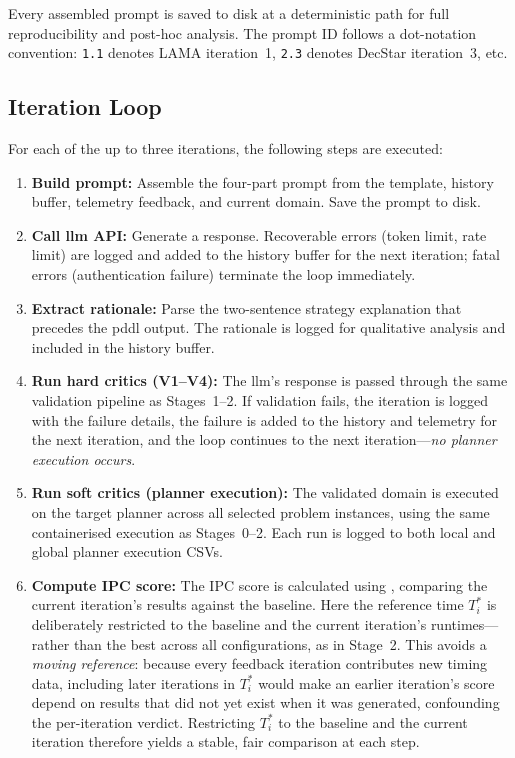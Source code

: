 Every assembled prompt is saved to disk at a deterministic path for full reproducibility and post-hoc analysis.
The prompt ID follows a dot-notation convention: \texttt{1.1} denotes LAMA iteration~1, \texttt{2.3} denotes DecStar iteration~3, etc.

\subsection{Iteration Loop}
\label{sec:design:stage3:loop}

For each of the up to three iterations, the following steps are executed:

\begin{enumerate}
  \item \textbf{Build prompt:}
        Assemble the four-part prompt from the template, history buffer, telemetry feedback, and current domain.
        Save the prompt to disk.

  \item \textbf{Call \gls{llm} API:}
        Generate a response.
        Recoverable errors (token limit, rate limit) are logged and added to the history buffer for the next iteration; fatal errors (authentication failure) terminate the loop immediately.

  \item \textbf{Extract rationale:}
        Parse the two-sentence strategy explanation that precedes the \gls{pddl} output.
        The rationale is logged for qualitative analysis and included in the history buffer.

  \item \textbf{Run hard critics (V1--V4):}
        The \gls{llm}'s response is passed through the same validation pipeline as Stages~1--2.
        If validation fails, the iteration is logged with the failure details, the failure is added to the history and telemetry for the next iteration, and the loop continues to the next iteration---\emph{no planner execution occurs}.

  \item \textbf{Run soft critics (planner execution):}
        The validated domain is executed on the target planner across all selected problem instances, using the same containerised execution as Stages~0--2.
        Each run is logged to both local and global planner execution CSVs.

  \item \textbf{Compute IPC score:}
        The IPC score is calculated using , comparing the current iteration's results against the baseline.
        Here the reference time $T^*_i$ is deliberately restricted to the baseline and the current iteration's runtimes---rather than the best across all configurations, as in Stage~2.
        This avoids a \emph{moving reference}: because every feedback iteration contributes new timing data, including later iterations in $T^*_i$ would make an earlier iteration's score depend on results that did not yet exist when it was generated, confounding the per-iteration verdict.
        Restricting $T^*_i$ to the baseline and the current iteration therefore yields a stable, fair comparison at each step.


\end{enumerate}
